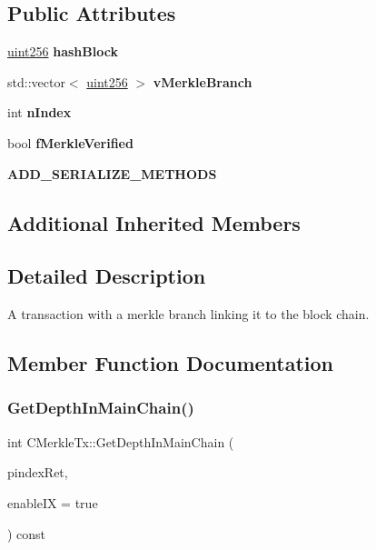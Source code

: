 \subsection*{Public Attributes}
\begin{DoxyCompactItemize}
\item 
\mbox{\label{class_c_merkle_tx_a788ee54c14b6d9706eb3737404663238}} 
\mbox{\hyperlink{classuint256}{uint256}} {\bfseries hash\+Block}
\item 
\mbox{\label{class_c_merkle_tx_a9ae6a408be914f486ebbb4161879ee69}} 
std\+::vector$<$ \mbox{\hyperlink{classuint256}{uint256}} $>$ {\bfseries v\+Merkle\+Branch}
\item 
\mbox{\label{class_c_merkle_tx_a829655e70702fdf97b6e534dd3227b0b}} 
int {\bfseries n\+Index}
\item 
\mbox{\label{class_c_merkle_tx_a3626572f7dbb86eb1c36a6570d740c7f}} 
bool {\bfseries f\+Merkle\+Verified}
\item 
\mbox{\label{class_c_merkle_tx_a86d607a3e47700ed5ebcdd4d4fcda4d7}} 
{\bfseries A\+D\+D\+\_\+\+S\+E\+R\+I\+A\+L\+I\+Z\+E\+\_\+\+M\+E\+T\+H\+O\+DS}
\end{DoxyCompactItemize}
\subsection*{Additional Inherited Members}


\subsection{Detailed Description}
A transaction with a merkle branch linking it to the block chain. 

\subsection{Member Function Documentation}
\mbox{\label{class_c_merkle_tx_a5bf3a355593ecce5799de92d013149b1}} 
\subsubsection{\texorpdfstring{GetDepthInMainChain()}{GetDepthInMainChain()}}
{\footnotesize\ttfamily int C\+Merkle\+Tx\+::\+Get\+Depth\+In\+Main\+Chain (\begin{DoxyParamCaption}\item[{const \mbox{\hyperlink{class_c_block_index}{C\+Block\+Index}} $\ast$\&}]{pindex\+Ret,  }\item[{bool}]{enable\+IX = {\ttfamily true} }\end{DoxyParamCaption}) const}

